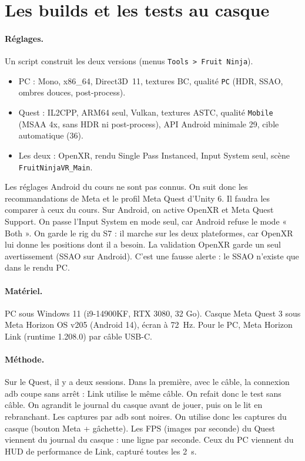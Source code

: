 \documentclass[11pt,a4paper]{article}
\begin{document}
\section{Les builds et les tests au casque}

\paragraph{Réglages.} Un script construit les deux versions (menus \texttt{Tools > Fruit Ninja}).
\begin{itemize}
\item PC : Mono, x86\_64, Direct3D~11, textures BC, qualité \texttt{PC} (HDR, SSAO, ombres douces,
  post-process).
\item Quest : IL2CPP, ARM64 seul, Vulkan, textures ASTC, qualité \texttt{Mobile} (MSAA 4x, sans HDR ni
  post-process), API Android minimale 29, cible automatique (36).
\item Les deux : OpenXR, rendu Single Pass Instanced, Input System seul, scène \texttt{FruitNinjaVR\_Main}.
\end{itemize}

Les réglages Android du cours ne sont pas connus. On suit donc les recommandations de Meta et le profil
Meta Quest d'Unity 6. Il faudra les comparer à ceux du cours. Sur Android, on active OpenXR et Meta
Quest Support. On passe l'Input System en mode seul, car Android refuse le mode « Both ». On garde le
rig du S7 : il marche sur les deux plateformes, car OpenXR lui donne les positions dont il a besoin.
La validation OpenXR garde un seul avertissement (SSAO sur Android). C'est une fausse alerte : le
SSAO n'existe que dans le rendu PC.

\paragraph{Matériel.} PC sous Windows 11 (i9-14900KF, RTX 3080, 32 Go). Casque Meta Quest 3 sous Meta
Horizon OS v205 (Android 14), écran à 72~Hz. Pour le PC, Meta Horizon Link (runtime 1.208.0) par
câble USB-C.

\paragraph{Méthode.} Sur le Quest, il y a deux sessions. Dans la première, avec le câble, la
connexion adb coupe sans arrêt : Link utilise le même câble. On refait donc le test sans câble. On
agrandit le journal du casque avant de jouer, puis on le lit en rebranchant. Les captures par adb sont
noires. On utilise donc les captures du casque (bouton Meta + gâchette). Les FPS (images par seconde)
du Quest viennent du journal du casque : une ligne par seconde. Ceux du PC viennent du HUD de
performance de Link, capturé toutes les 2~s.
\end{document}
